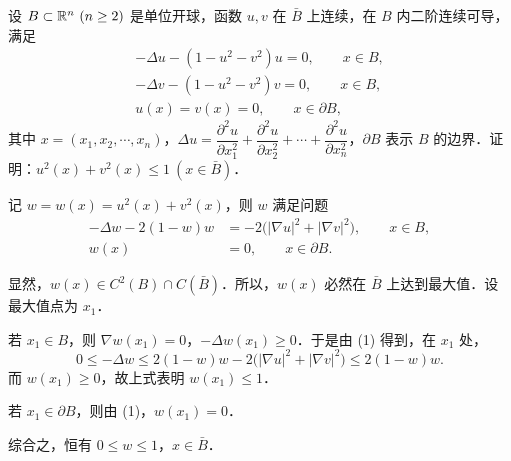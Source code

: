 设 $B\subset\mathbb{R}^n\ (n\ge2)$ 是单位开球，函数 $u,v$ 在 $\bar B$ 上连续，在 $B$ 内二阶连续可导，满足
\[
\begin{gathered}
  -\Delta u-(1-u^2-v^2)u=0,\qquad x\in B,\\
  -\Delta v-(1-u^2-v^2)v=0,\qquad x\in B,\\
  u(x)=v(x)=0,\qquad x\in\partial B,
\end{gathered}
\]
其中 $x=(x_1,x_2,\cdots,x_n)$，$\Delta u=\dfrac{\partial^2u}{\partial x_1^2}+\dfrac{\partial^2u}{\partial x_2^2}+\cdots+\dfrac{\partial^2u}{\partial x_n^2}$，$\partial B$ 表示 $B$ 的边界．证明：$u^2(x)+v^2(x)\le1\ (x\in\bar B)$．
\begin{solution}
记 $w=w(x)=u^2(x)+v^2(x)$，则 $w$ 满足问题
\begin{align*}
  -\Delta w-2(1-w)w&=-2\bigl(|\nabla u|^2+|\nabla v|^2\bigr),\qquad x\in B,\tag{1}\\
  w(x)&=0,\qquad x\in\partial B.
\end{align*}

显然，$w(x)\in C^2(B)\cap C(\bar B)$．所以，$w(x)$ 必然在 $\bar B$ 上达到最大值．设最大值点为 $x_1$．

若 $x_1\in B$，则 $\nabla w(x_1)=0$，$-\Delta w(x_1)\ge0$．于是由 (1) 得到，在 $x_1$ 处，
\[
  0\le-\Delta w\le2(1-w)w-2\bigl(|\nabla u|^2+|\nabla v|^2\bigr)\le2(1-w)w.
\]
而 $w(x_1)\ge0$，故上式表明 $w(x_1)\le1$．

若 $x_1\in\partial B$，则由 (1)，$w(x_1)=0$．

综合之，恒有 $0\le w\le1$，$x\in\bar B$．
\end{solution}

